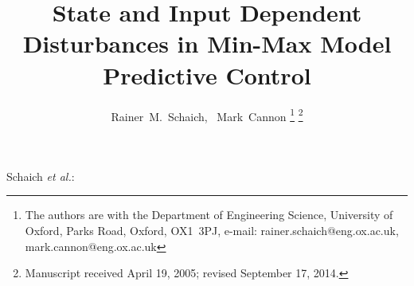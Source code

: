 \documentclass[journal]{IEEEtran}
\theoremstyle{remark}
\theoremstyle{definition}
\begin{document}
%
\title{State and Input Dependent Disturbances in Min-Max Model Predictive Control}
%
%
%

\author{Rainer~M.~Schaich,~
        Mark~Cannon
\thanks{The authors are with the Department of Engineering Science, University of
Oxford, Parks Road, Oxford, OX1~3PJ, e-mail: rainer.schaich@eng.ox.ac.uk, 
mark.cannon@eng.ox.ac.uk}%
\thanks{Manuscript received April 19, 2005; revised September 17, 2014.}}

% 
%



%
{Schaich \MakeLowercase{\textit{et al.}}: \thetitle}
% 
\end{document}
